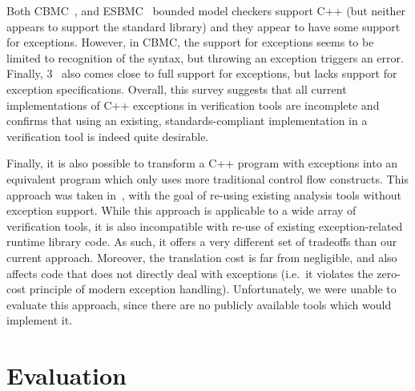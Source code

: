 Both CBMC~\cite{Clarke2004}, \cite{Kroening2014} and
ESBMC~\cite{Gadelha2018} bounded model checkers support C++
(but neither appears to support the standard library) and they appear to have some
support for exceptions.
However, in CBMC, the support for exceptions seems to be limited to recognition
of the  syntax, but throwing an exception triggers an error.
Finally, \divine{} 3~\cite{RBB16} also comes close to
full support for exceptions, but lacks support for exception
specifications. Overall, this survey suggests that all current
implementations of C++ exceptions in verification tools are incomplete
and confirms that using an existing, standards-compliant implementation
in a verification tool is indeed quite desirable.

Finally, it is also possible to transform a C++ program with exceptions
into an equivalent program which only uses more traditional control flow
constructs. This approach was taken in~\cite{Prabhu2011},
with the goal of re-using existing analysis tools without exception
support. While this approach is applicable to a wide array of
verification tools, it is also incompatible with re-use of existing
exception-related runtime library code. As such, it offers a very
different set of tradeoffs than our current approach. Moreover, the
translation cost is far from negligible, and also affects code that does
not directly deal with exceptions (i.e.~it violates the zero-cost
principle of modern exception handling). Unfortunately, we were unable
to evaluate this approach, since there are no publicly available tools
which would implement it.

\section{Evaluation}\label{sec:lang:evaluation}

